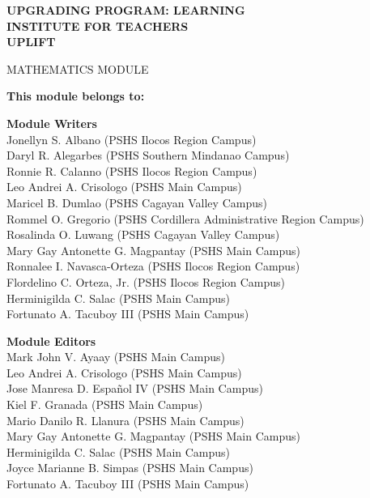 \documentclass[10pt,a4paper]{report}
\begin{document}
\begin{titlepage}
\begin{center}
\bfseries
{\LARGE UPGRADING PROGRAM: LEARNING}\\[24pt]
{\LARGE INSTITUTE FOR TEACHERS}\\[24pt]
{\LARGE UPLIFT}
\vfill

{\LARGE MATHEMATICS MODULE}
\vfill

\textbf{This module belongs to:}\\[24pt]

\noindent
\hrulefill
\end{center}
\newpage
\thispagestyle{empty}
\vfil
\begin{center}
{\LARGE \bfseries Module Writers}\\[12pt]
Jonellyn S. Albano (PSHS Ilocos Region Campus)\\
Daryl R. Alegarbes (PSHS Southern Mindanao Campus)\\
Ronnie R. Calanno (PSHS Ilocos Region Campus)\\
Leo Andrei A. Crisologo (PSHS Main Campus)\\
Maricel B. Dumlao (PSHS Cagayan Valley Campus)\\
Rommel O. Gregorio (PSHS Cordillera Administrative Region Campus)\\
Rosalinda O. Luwang (PSHS Cagayan Valley Campus)\\
Mary Gay Antonette G. Magpantay (PSHS Main Campus)\\
Ronnalee I. Navasca-Orteza (PSHS Ilocos Region Campus)\\
Flordelino C. Orteza, Jr. (PSHS Ilocos Region Campus)\\
Herminigilda C. Salac (PSHS Main Campus)\\
Fortunato A. Tacuboy III (PSHS Main Campus)
\end{center}
\vfil
\begin{center}
{\LARGE\bfseries Module Editors}\\[12pt]
Mark John V. Ayaay (PSHS Main Campus)\\
Leo Andrei A. Crisologo (PSHS Main Campus)\\
Jose Manresa D. Español IV (PSHS Main Campus)\\
Kiel F. Granada (PSHS Main Campus)\\
Mario Danilo R. Llanura (PSHS Main Campus)\\
Mary Gay Antonette G. Magpantay (PSHS Main Campus)\\
Herminigilda C. Salac (PSHS Main Campus)\\
Joyce Marianne B. Simpas (PSHS Main Campus)\\
Fortunato A. Tacuboy III (PSHS Main Campus)
\end{center}
\newpage
\thispagestyle{empty}


\end{titlepage}
\end{document}
